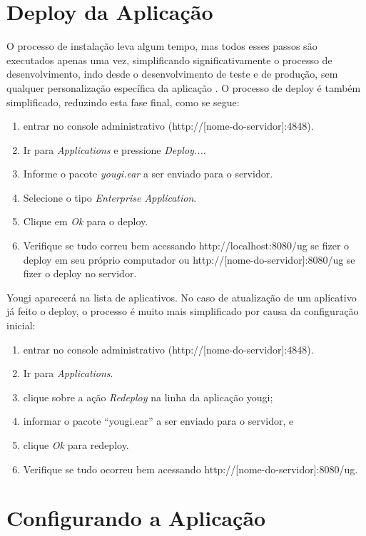 \documentclass[envcountsame,envcountchap,letterpaper]{svmono}
\begin{document}
\section{Deploy da Aplicação}

O processo de instalação leva algum tempo, mas todos esses passos são executados apenas uma vez, simplificando significativamente o processo de desenvolvimento, indo desde o desenvolvimento de teste e de produção, sem qualquer personalização específica da aplicação . O processo de deploy é também simplificado, reduzindo esta fase final, como se segue:

\begin{enumerate}
\item entrar no console administrativo (http://[nome-do-servidor]:4848).
\item Ir para \textit{Applications} e pressione \textit{Deploy...}.
\item Informe o pacote \textit{yougi.ear} a ser enviado para o servidor.
\item Selecione o tipo \textit{Enterprise Application}.
\item Clique em \textit{Ok} para o deploy.
\item Verifique se tudo correu bem acessando http://localhost:8080/ug se fizer o deploy em seu próprio computador ou http://[nome-do-servidor]:8080/ug se fizer o deploy no servidor.
\end{enumerate}

Yougi aparecerá na lista de aplicativos. No caso de atualização de um aplicativo já feito o deploy, o processo é muito mais simplificado por causa da configuração inicial:

\begin{enumerate}
\item entrar no console administrativo (http://[nome-do-servidor]:4848).
\item Ir para \textit{Applications}.
\item clique sobre a ação \textit{Redeploy} na linha da aplicação yougi;
\item informar o pacote “yougi.ear” a ser enviado para o servidor, e
\item clique \textit{Ok} para redeploy.
\item Verifique se tudo ocorreu bem acessando http://[nome-do-servidor]:8080/ug.
\end{enumerate}

\section{Configurando a Aplicação}
\end{document}
